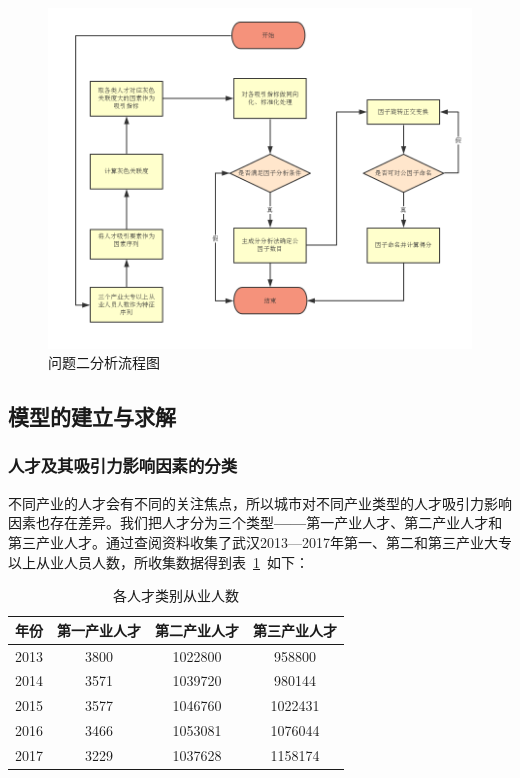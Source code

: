 \documentclass{whutmod}
\begin{document}
	\begin{figure}[H]
	\centering
	\includegraphics[width=\textwidth]{figures/2222.png}
	\caption{问题二分析流程图}\label{2222}
	\end{figure}



	\subsection{模型的建立与求解}

	\subsubsection{人才及其吸引力影响因素的分类}
	不同产业的人才会有不同的关注焦点，所以城市对不同产业类型的人才吸引力影响因素也存在差异。我们把人才分为三个类型\textbf{——}第一产业人才、第二产业人才和第三产业人才。通过查阅资料\parencite{武汉统计局}收集了武汉2013—2017年第一、第二和第三产业大专以上从业人员人数，所收集数据得到表~\ref{hhh}~如下：
	\begin{table}[H]
		\centering
		\caption{各人才类别从业人数}\label{hhh}
		\begin{tabular}{cccc}
			\toprule[2pt]
			\multicolumn{1}{m{2cm}}{\centering 年份}&
			\multicolumn{1}{m{3cm}}{\centering 第一产业人才} & \multicolumn{1}{m{3cm}}{\centering 第二产业人才} & \multicolumn{1}{m{3cm}}{\centering 第三产业人才}\\
			\midrule[1pt]
			2013	 &  3800 & 1022800&958800\\ 
			2014 & 3571 & 1039720&980144\\ 
			2015	 &  3577&1046760&1022431\\ 
			2016  &  3466& 1053081&1076044\\ 
			2017  & 3229& 1037628&1158174\\
			\bottomrule[2pt]
		\end{tabular}
	\end{table}
\end{document}
